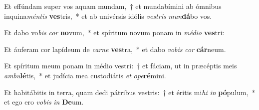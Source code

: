 \item Et effúndam super vos aquam mundam,~† et mundabímini ab ómnibus inquina\textit{mén}\textit{tis} \textbf{ves}tris,~* et ab univérsis idólis \textit{ves}\textit{tris} \textit{mun}\textbf{dá}bo vos.
\item Et dabo vo\textit{bis} \textit{cor} \textbf{no}vum,~* et spíritum novum ponam in \textit{mé}\textit{di}\textit{o} \textbf{ves}tri:
\item Et áuferam cor lapídeum de \textit{car}\textit{ne} \textbf{ves}tra,~* et dabo \textit{vo}\textit{bis} \textit{cor} \textbf{cár}neum.
\item Et spíritum meum ponam in médio vestri:~† et fáciam, ut in præcéptis meis \textit{am}\textit{bu}\textbf{lé}tis,~* et judícia mea custodiátis \textit{et} \textit{o}\textit{pe}\textbf{ré}mini.
\item Et habitábitis in terra, quam dedi pátribus vestris:~† et éritis mi\textit{hi} \textit{in} \textbf{pó}pulum,~* et ego ero \textit{vo}\textit{bis} \textit{in} \textbf{De}um.
